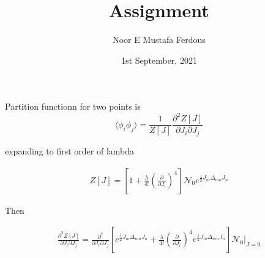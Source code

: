 \documentclass{article}
\author{Noor E Mustafa Ferdous}
\title{Assignment}
\date{1st September, 2021}
\newcommand*{\1}{\hspace{1pt}}
\begin{document}
    Partition functionn for two points is
    \begin{equation}
        \langle \phi_{i} \phi_{j} \rangle = \frac{1}{Z[J]} \frac{\partial ^{2} Z[J]}{{\partial J_{i} \partial J_{j}}} 
    \end{equation}
    
    expanding to first order of lambda

    \begin{equation}
    \begin{split}
        Z[J] = [1 + \frac{\lambda}{4!}(\frac{\partial}{\partial J_{i}})^{4} ] \mathcal{N}_{0} e^{\frac{1}{2} J_{m} \Delta _{mn} J_{n}}
    \end{split}
    \end{equation}
    
    
    Then

    \begin{equation}
    \begin{split}
        \frac{\partial ^{2} Z[J]}{\partial J_{i} \partial J_{j}} =\frac{\partial ^{2}}{\partial J_{i} \partial J_{j}} [e^{\frac{1}{2} J_{m} \Delta _{mn} J_{n}} + \frac{\lambda}{4!}(\frac{\partial}{\partial J_{i}})^{4} e^{\frac{1}{2} J_{m} \Delta _{mn} J_{n}} ] \mathcal{N}_{0} \Biggr|_{J=0}
    \end{split}
    \end{equation}
\end{document}
